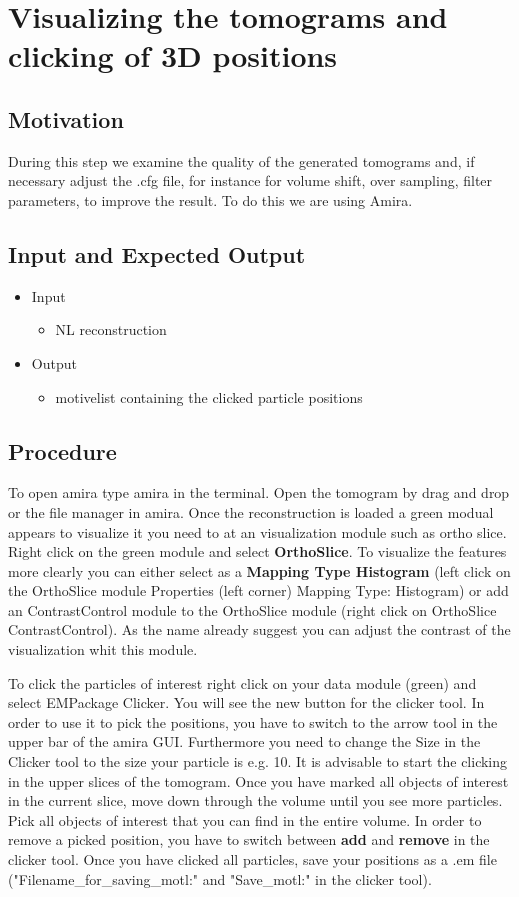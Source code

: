 \documentclass[12pt,a4paper]{scrartcl}
\begin{document}
{\section{Visualizing the tomograms and clicking of 3D positions}
\subsection{Motivation}
During this step we examine the quality of the generated tomograms and, if necessary adjust the .cfg file, for instance for volume shift, over sampling, filter parameters, to improve the result. To do this we are using Amira.     
\subsection{Input and Expected Output}
\begin{itemize}
\item Input
\begin{itemize}
\item NL reconstruction
\end{itemize}
\item Output
\begin{itemize}
\item motivelist containing the clicked particle positions   
\end{itemize} 
\end{itemize}
\subsection{Procedure}
To open amira type amira in the terminal. Open the tomogram by drag and drop or the file manager in amira. Once the reconstruction is loaded a green modual appears to visualize it you need to at an visualization module such as ortho slice. Right click on the green module and select \textbf{OrthoSlice}. To visualize the features more clearly you can either select as a \textbf{Mapping Type Histogram} (left click on the OrthoSlice module \textrightarrow{} Properties (left corner) \textrightarrow{} Mapping Type: Histogram) or add an ContrastControl module to the OrthoSlice module (right click on OrthoSlice \textrightarrow{} ContrastControl). As the name already suggest you can adjust the contrast of the visualization whit this module.

To click the particles of interest right click on your data module (green) and select \textrightarrow{} EMPackage \textrightarrow{} Clicker. You will see the new button for the clicker tool. In order to use it to pick the positions, you have to switch to the arrow tool in the upper bar of the amira GUI. Furthermore you need to change the Size in the Clicker tool to the size your particle is e.g. 10.  It is advisable to start the clicking in the upper slices of the tomogram. 
Once you have marked all objects of interest in the current slice, move down through the volume until you see more particles. Pick all objects of interest that you can find in the entire volume. In order to remove a picked position, you have to switch between \textbf{add} and \textbf{remove} in the clicker tool. Once you have clicked all particles, save your positions  as a .em file ("Filename\_for\_saving\_motl:" and "Save\_motl:" in the clicker tool).

}
\end{document}

